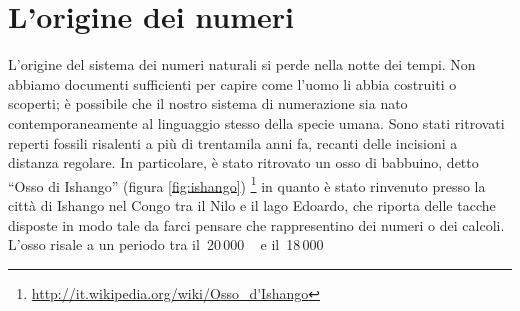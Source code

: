 \section{L'origine dei numeri}
\label{sec:nat_origine}

L'origine del sistema dei numeri naturali si perde nella notte dei tempi. 
Non abbiamo documenti sufficienti per capire come l'uomo li abbia costruiti 
o scoperti; è possibile che il nostro sistema di numerazione sia nato 
contemporaneamente al linguaggio stesso della specie umana. 
Sono stati ritrovati reperti fossili risalenti a più di trentamila
anni fa, recanti delle incisioni a distanza regolare. 
In particolare, è stato ritrovato un osso di babbuino, 
detto “Osso di Ishango” 
(figura \ref{fig:ishango}) 
\footnote{\url{http://it.wikipedia.org/wiki/Osso_d'Ishango}} 
in quanto è stato rinvenuto presso la città di Ishango nel Congo tra il 
Nilo e il lago Edoardo, che riporta delle tacche disposte in modo tale da 
farci pensare che rappresentino dei numeri o dei calcoli. L'osso risale a
un periodo tra il~20\,000\,~\aC~e il~18\,000\,~\aC


